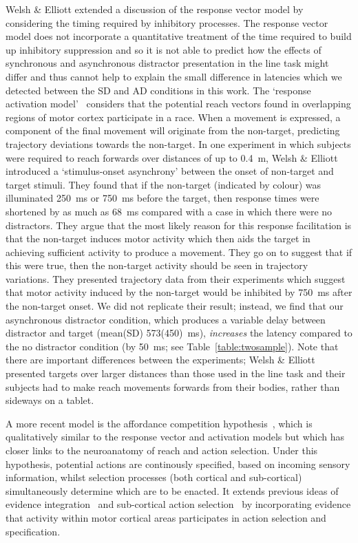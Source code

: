 \documentclass[10pt,letterpaper]{article}
\begin{document}
Welsh \& Elliott extended a discussion of the response vector model by
considering the timing required by inhibitory processes. The response
vector model does not incorporate a quantitative treatment of the time
required to build up inhibitory suppression and so it is not able to
predict how the effects of synchronous and asynchronous distractor
presentation in the line task might differ and thus cannot help to
explain the small difference in latencies which we detected between
the SD and AD conditions in this work. The `response activation
model'~\cite{welsh_movement_2004} considers that the potential reach
vectors found in overlapping regions of motor cortex participate in a
race. When a movement is expressed, a component of the final movement
will originate from the non-target, predicting trajectory deviations
towards the non-target.  In one experiment in which subjects were
required to reach forwards over distances of up to 0.4~m, Welsh \&
Elliott~\cite{welsh_movement_2004} introduced a `stimulus-onset
asynchrony' between the onset of non-target and target stimuli. They
found that if the non-target (indicated by colour) was illuminated
250~ms or 750~ms before the target, then response times were shortened
by as much as 68~ms compared with a case in which there were no
distractors. They argue that the most likely reason for this response
facilitation is that the non-target induces motor activity which then
aids the target in achieving sufficient activity to produce a
movement. They go on to suggest that if this were true, then the
non-target activity should be seen in trajectory variations. They
presented trajectory data from their experiments which suggest that
motor activity induced by the non-target would be inhibited by 750~ms
after the non-target onset. We did not replicate their result;
instead, we find that our asynchronous distractor condition, which
produces a variable delay between distractor and target (mean(SD)
573(450)~ms), \emph{increases} the latency compared to the no
distractor condition (by 50~ms; see Table~\ref{table:twosample}). Note
that there are important differences between the experiments; Welsh \&
Elliott presented targets over larger distances than those used in the
line task and their subjects had to make reach movements forwards from
their bodies, rather than sideways on a tablet.

A more recent model is the affordance competition
hypothesis~\cite{cisek_cortical_2007}, which is qualitatively similar
to the response vector and activation models but which has closer
links to the neuroanatomy of reach and action selection. Under this
hypothesis, potential actions are continously specified, based on
incoming sensory information, whilst selection processes (both
cortical and sub-cortical) simultaneously determine which are to be
enacted. It extends previous ideas of evidence
integration~\cite{mazurek_role_2003,bogacz_physics_2006} and
sub-cortical action
selection~\cite{redgrave_basal_1999,grillner_mechanisms_2005,houk_action_2007}
by incorporating evidence that activity within motor cortical areas
participates in action selection and specification.
\end{document}
